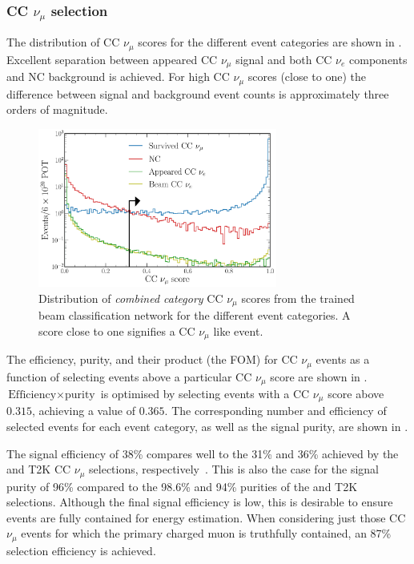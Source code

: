 \subsubsection*{CC $\nu_{\mu}$ selection} %

The distribution of CC $\nu_{\mu}$ scores for the different event categories are shown in
. Excellent separation between appeared CC $\nu_{\mu}$
signal and both CC $\nu_{e}$ components and NC background is achieved. For high CC $\nu_{\mu}$
scores (close to one) the difference between signal and background event counts is approximately
three orders of magnitude.

\begin{figure} %
    \includegraphics[width=0.7\textwidth]{diagrams/7-results/final_beam_numu_outputs.pdf}
    \caption[Distribution of CC $\nu_{\mu}$ scores from the trained beam classification network]
    {Distribution of \emph{combined category} CC $\nu_{\mu}$ scores from the trained beam
        classification network for the different event categories. A score close to one signifies
        a CC $\nu_{\mu}$ like event.}
    \label{fig:final_beam_numu_outputs}
\end{figure}

The efficiency, purity, and their product (the FOM) for CC $\nu_{\mu}$ events as a function of
selecting events above a particular CC $\nu_{\mu}$ score are shown in
. $\text{Efficiency}\times\text{purity}$ is optimised by
selecting events with a CC $\nu_{\mu}$ score above $0.315$, achieving a value of $0.365$. The
corresponding number and efficiency of selected events for each event category, as well as the
signal purity, are shown in . 

The signal efficiency of 38\% compares well to the 31\% and 36\% achieved by the \nova and T2K CC
$\nu_{\mu}$ selections, respectively~\cite{acero2019, abe2015}. This is also the case for the
signal purity of 96\% compared to the 98.6\% and 94\% purities of the \nova and T2K selections.
Although the final signal efficiency is low, this is desirable to ensure events are fully
contained for energy estimation. When considering just those CC $\nu_{\mu}$ events for which the
primary charged muon is truthfully contained, an 87\% selection efficiency is achieved.

